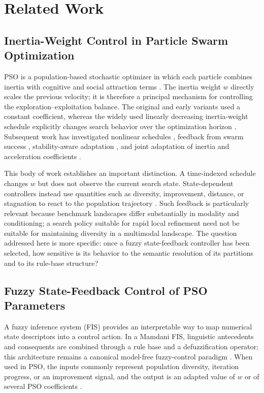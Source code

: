 \section{Related Work}
\label{sec:related_work}

\subsection{Inertia-Weight Control in Particle Swarm Optimization}
\label{subsec:pso_inertia}

PSO is a population-based stochastic optimizer in which each particle combines inertia with cognitive and social attraction terms \cite{KennedyEberhart1995}. The inertia weight $w$ directly scales the previous velocity; it is therefore a principal mechanism for controlling the exploration--exploitation balance. The original and early variants used a constant coefficient, whereas the widely used linearly decreasing inertia-weight schedule explicitly changes search behavior over the optimization horizon \cite{ShiEberhart1998}. Subsequent work has investigated nonlinear schedules \cite{Chatterjee2006}, feedback from swarm success \cite{Nickabadi2011}, stability-aware adaptation \cite{Taherkhani2015}, and joint adaptation of inertia and acceleration coefficients \cite{Duan2022,Han2024}.

This body of work establishes an important distinction. A time-indexed schedule changes $w$ but does not observe the current search state. State-dependent controllers instead use quantities such as diversity, improvement, distance, or stagnation to react to the population trajectory \cite{Nickabadi2011,Taherkhani2015}. Such feedback is particularly relevant because benchmark landscapes differ substantially in modality and conditioning; a search policy suitable for rapid local refinement need not be suitable for maintaining diversity in a multimodal landscape. The question addressed here is more specific: once a fuzzy state-feedback controller has been selected, how sensitive is its behavior to the semantic resolution of its partitions and to its rule-base structure?

\subsection{Fuzzy State-Feedback Control of PSO Parameters}
\label{subsec:fuzzy_pso}

A fuzzy inference system (FIS) provides an interpretable way to map numerical state descriptors into a control action. In a Mamdani FIS, linguistic antecedents and consequents are combined through a rule base and a defuzzification operator; this architecture remains a canonical model-free fuzzy-control paradigm \cite{Mamdani1974,Lee1990,Nguyen2019Fuzzy}. When used in PSO, the inputs commonly represent population diversity, iteration progress, or an improvement signal, and the output is an adapted value of $w$ or of several PSO coefficients \cite{ShiEberhart2001,Nobile2018,Valdez2017}.

